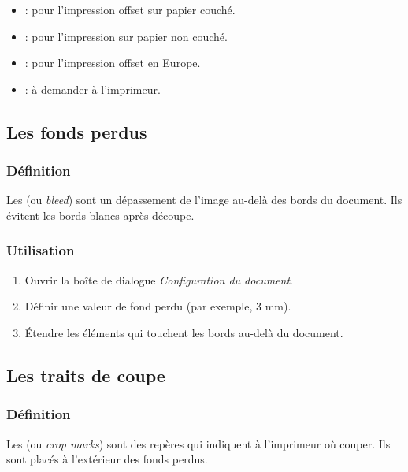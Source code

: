 \begin{itemize}
    \item {} : pour l'impression offset sur papier couché.
    \item {} : pour l'impression sur papier non couché.
    \item {} : pour l'impression offset en Europe.
    \item {} : à demander à l'imprimeur.
\end{itemize}

\subsection{Les fonds perdus}

\subsubsection{Définition}

Les  (ou \emph{bleed}) sont un dépassement de l'image au-delà des bords du document. Ils évitent les bords blancs après découpe.

\subsubsection{Utilisation}

\begin{enumerate}
    \item Ouvrir la boîte de dialogue \emph{Configuration du document}.
    \item Définir une valeur de fond perdu (par exemple, 3 mm).
    \item Étendre les éléments qui touchent les bords au-delà du document.
\end{enumerate}

\subsection{Les traits de coupe}

\subsubsection{Définition}

Les  (ou \emph{crop marks}) sont des repères qui indiquent à l'imprimeur où couper. Ils sont placés à l'extérieur des fonds perdus.


